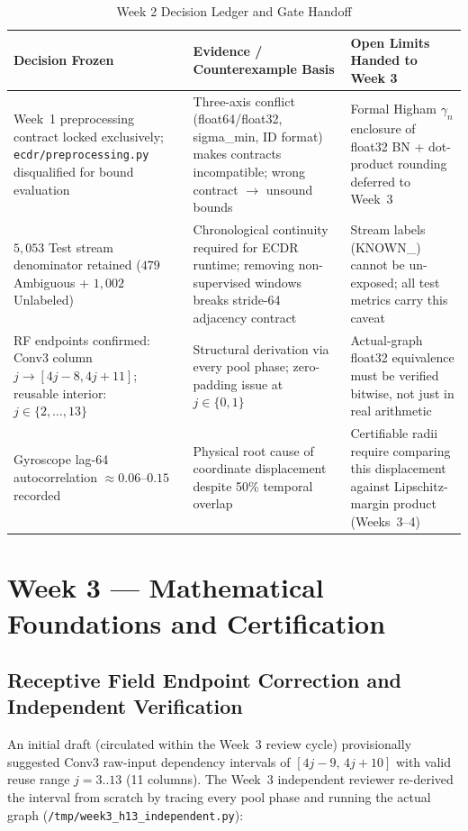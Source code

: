 \documentclass[11pt,oneside,a4paper]{report}
\newcommand{\code}[1]{{\small\upshape\ttfamily #1}}
\newcommand{\pathcode}[1]{{\small\upshape\ttfamily\nolinkurl{#1}}}
\theoremstyle{remark}
\begin{document}
\begin{table}[htbp]
\centering\small
\caption{Week 2 Decision Ledger and Gate Handoff}\label{tab:w2_ledger}
\begin{tabularx}{\textwidth}{@{}P{3.5cm}YP{4.1cm}@{}}
\toprule
\textbf{Decision Frozen} & \textbf{Evidence / Counterexample Basis} & \textbf{Open Limits Handed to Week 3} \\
\midrule
Week~1 preprocessing contract locked exclusively; \pathcode{ecdr/preprocessing.py} disqualified for bound evaluation & Three-axis conflict (\code{float64}/\code{float32}, \code{sigma\_min}, ID format) makes contracts incompatible; wrong contract $\to$ unsound bounds & Formal Higham $\gamma_n$ enclosure of \code{float32} BN + dot-product rounding deferred to Week~3 \\
\addlinespace
$5{,}053$ Test stream denominator retained ($479$ Ambiguous + $1{,}002$ Unlabeled) & Chronological continuity required for ECDR runtime; removing non-supervised windows breaks stride-64 adjacency contract & Stream labels (\code{KNOWN\_}\allowbreak\code{TEST\_}\allowbreak\code{EXPLORATORY}) cannot be un-exposed; all test metrics carry this caveat \\
\addlinespace
RF endpoints confirmed: Conv3 column $j \to [4j{-}8,4j{+}11]$; reusable interior: $j \in \{2,\ldots,13\}$ & Structural derivation via every pool phase; zero-padding issue at $j \in \{0,1\}$ & Actual-graph \code{float32} equivalence must be verified bitwise, not just in real arithmetic \\
\addlinespace
Gyroscope lag-64 autocorrelation $\approx 0.06$--$0.15$ recorded & Physical root cause of coordinate displacement despite 50\% temporal overlap & Certifiable radii require comparing this displacement against Lipschitz-margin product (Weeks~3--4) \\
\bottomrule
\end{tabularx}
\end{table}

\chapter{Week 3 --- Mathematical Foundations and Certification}

\section{Receptive Field Endpoint Correction and Independent Verification}
An initial draft (circulated within the Week~3 review cycle) provisionally suggested Conv3 raw-input dependency intervals of $[4j{-}9,\, 4j{+}10]$ with valid reuse range $j=3..13$ (11 columns). The Week~3 independent reviewer re-derived the interval from scratch by tracing every pool phase and running the actual graph (\pathcode{/tmp/week3_h13_independent.py}):
\end{document}
